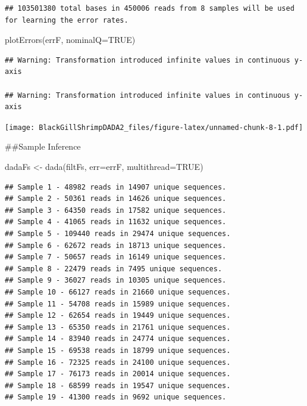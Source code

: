 \documentclass[
]{article}
\newenvironment{Shaded}{\begin{snugshade}}{\end{snugshade}}
\newcommand{\AttributeTok}[1]{\textcolor[rgb]{0.77,0.63,0.00}{#1}}
\newcommand{\ConstantTok}[1]{\textcolor[rgb]{0.00,0.00,0.00}{#1}}
\newcommand{\FunctionTok}[1]{\textcolor[rgb]{0.00,0.00,0.00}{#1}}
\newcommand{\NormalTok}[1]{#1}
\newcommand{\OtherTok}[1]{\textcolor[rgb]{0.56,0.35,0.01}{#1}}
\begin{document}
\begin{verbatim}
## 103501380 total bases in 450006 reads from 8 samples will be used for learning the error rates.
\end{verbatim}

\begin{Shaded}
\begin{Highlighting}[]
\FunctionTok{plotErrors}\NormalTok{(errF, }\AttributeTok{nominalQ=}\ConstantTok{TRUE}\NormalTok{)}
\end{Highlighting}
\end{Shaded}

\begin{verbatim}
## Warning: Transformation introduced infinite values in continuous y-axis

## Warning: Transformation introduced infinite values in continuous y-axis
\end{verbatim}

\texttt{[image: BlackGillShrimpDADA2\_files/figure-latex/unnamed-chunk-8-1.pdf]}

\#\#Sample Inference

\begin{Shaded}
\begin{Highlighting}[]
\NormalTok{dadaFs }\OtherTok{\textless{}{-}} \FunctionTok{dada}\NormalTok{(filtFs, }\AttributeTok{err=}\NormalTok{errF, }\AttributeTok{multithread=}\ConstantTok{TRUE}\NormalTok{)}
\end{Highlighting}
\end{Shaded}

\begin{verbatim}
## Sample 1 - 48982 reads in 14907 unique sequences.
## Sample 2 - 50361 reads in 14626 unique sequences.
## Sample 3 - 64350 reads in 17582 unique sequences.
## Sample 4 - 41065 reads in 11632 unique sequences.
## Sample 5 - 109440 reads in 29474 unique sequences.
## Sample 6 - 62672 reads in 18713 unique sequences.
## Sample 7 - 50657 reads in 16149 unique sequences.
## Sample 8 - 22479 reads in 7495 unique sequences.
## Sample 9 - 36027 reads in 10305 unique sequences.
## Sample 10 - 66127 reads in 21660 unique sequences.
## Sample 11 - 54708 reads in 15989 unique sequences.
## Sample 12 - 62654 reads in 19449 unique sequences.
## Sample 13 - 65350 reads in 21761 unique sequences.
## Sample 14 - 83940 reads in 24774 unique sequences.
## Sample 15 - 69538 reads in 18799 unique sequences.
## Sample 16 - 72325 reads in 24100 unique sequences.
## Sample 17 - 76173 reads in 20014 unique sequences.
## Sample 18 - 68599 reads in 19547 unique sequences.
## Sample 19 - 41300 reads in 9692 unique sequences.
\end{verbatim}
\end{document}
